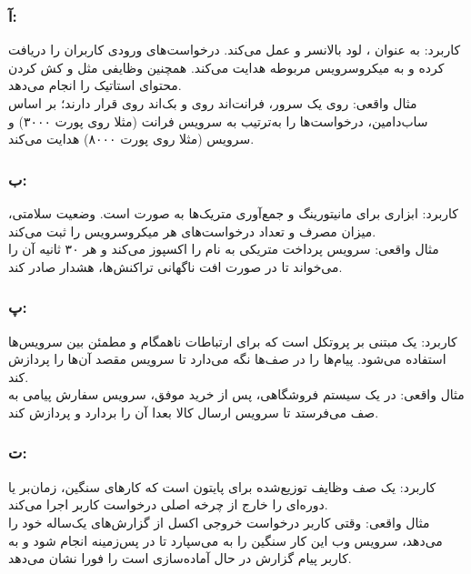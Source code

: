 \subsubsection*{آ: }
{کاربرد:} به عنوان ، لود بالانسر و  عمل می‌کند. درخواست‌های ورودی کاربران را دریافت کرده و به میکروسرویس مربوطه هدایت می‌کند. همچنین وظایفی مثل  و کش کردن محتوای استاتیک را انجام می‌دهد. \\
{مثال واقعی:} روی یک سرور، فرانت‌اند روی  و بک‌اند روی  قرار دارند؛  بر اساس ساب‌دامین، درخواست‌ها را به‌ترتیب به سرویس فرانت (مثلا  روی پورت ۳۰۰۰) و سرویس  (مثلا روی پورت ۸۰۰۰) هدایت می‌کند.

\subsubsection*{ب: }
{کاربرد:} ابزاری برای مانیتورینگ و جمع‌آوری متریک‌ها به صورت  است. وضعیت سلامتی، میزان مصرف  و تعداد درخواست‌های هر میکروسرویس را ثبت می‌کند. \\
{مثال واقعی:} سرویس پرداخت متریکی به نام  را اکسپوز می‌کند و  هر ۳۰ ثانیه آن را می‌خواند تا در صورت افت ناگهانی تراکنش‌ها، هشدار صادر کند.

\subsubsection*{پ: }
{کاربرد:} یک  مبتنی بر پروتکل  است که برای ارتباطات ناهمگام و مطمئن بین سرویس‌ها استفاده می‌شود. پیام‌ها را در صف‌ها نگه می‌دارد تا سرویس مقصد آن‌ها را پردازش کند. \\
{مثال واقعی:} در یک سیستم فروشگاهی، پس از خرید موفق، سرویس سفارش پیامی به صف  می‌فرستد تا سرویس ارسال کالا بعدا آن را بردارد و پردازش کند.

\subsubsection*{ت: }
{کاربرد:} یک صف وظایف توزیع‌شده برای پایتون است که کارهای سنگین، زمان‌بر یا دوره‌ای را خارج از چرخه اصلی درخواست کاربر اجرا می‌کند. \\
{مثال واقعی:} وقتی کاربر درخواست خروجی اکسل از گزارش‌های یک‌ساله خود را می‌دهد، سرویس وب این کار سنگین را به  می‌سپارد تا در پس‌زمینه انجام شود و به کاربر پیام گزارش در حال آماده‌سازی است را فورا نشان می‌دهد.

